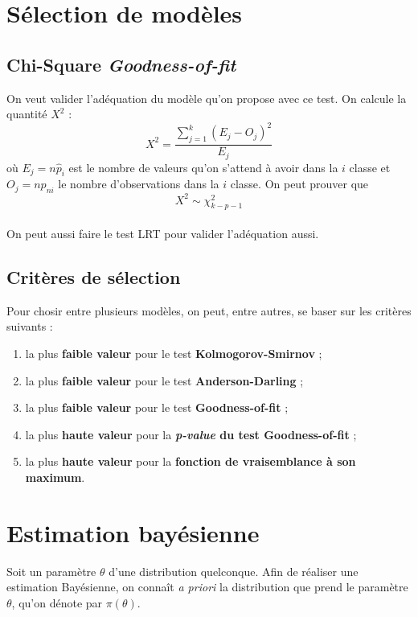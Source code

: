 \documentclass[french, landscape]{article}
\begin{document}
\begin{multicols*}{3}
\section{Sélection de modèles}
\subsection*{Chi-Square \emph{Goodness-of-fit}}
On veut valider l'adéquation du modèle qu'on propose avec ce test. On calcule la quantité $X^2$ : 
\[X^2 = \frac{\sum_{j=1}^{k}(E_j - O_j)^2 }{E_j}\]
où $E_j = n \hat{p}_i$ est le nombre de valeurs qu'on s'attend à avoir dans la $i$ classe et $O_j = n p_{ni}$ le nombre d'observations dans la $i$ classe. On peut prouver que
\[X^2 \sim \chi_{k-p-1}^2\] \\

On peut aussi faire le test LRT pour valider l'adéquation aussi.

\subsection*{Critères de sélection}
Pour chosir entre plusieurs modèles, on peut, entre autres, se baser sur les critères suivants : 
\begin{enumerate}
\item la plus \textbf{faible valeur} pour le test \textbf{Kolmogorov-Smirnov} ; 
\item  la plus \textbf{faible valeur} pour le test \textbf{Anderson-Darling} ;
\item  la plus \textbf{faible valeur} pour le test \textbf{Goodness-of-fit} ;
\item la plus \textbf{haute valeur} pour la \textbf{\emph{p-value} du test Goodness-of-fit} ; 
\item la plus \textbf{haute valeur} pour la \textbf{fonction de vraisemblance à son maximum}.
\end{enumerate}

\section{Estimation bayésienne}
\begin{definition}
Soit un paramètre $\theta$ d'une distribution quelconque. Afin de réaliser une estimation Bayésienne, on connaît \emph{a priori} la distribution que prend le paramètre $\theta$, qu'on dénote par $\pi(\theta)$. \\


\end{definition}
\end{multicols*}
\end{document}
